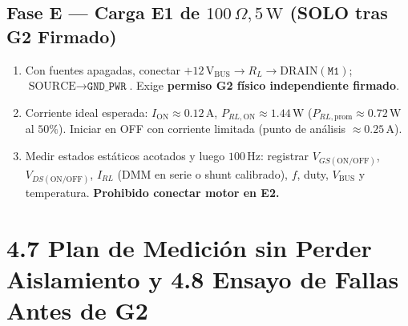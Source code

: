 \documentclass[10pt, a4paper, landscape]{article}
\begin{document}
\begin{minipage}[t]{0.48\linewidth}
\subsection*{Fase E — Carga E1 de $100\,\Omega, 5\,\text{W}$ (SOLO tras G2 Firmado)}
\begin{enumerate}[noitemsep, topsep=2pt]
    \item Con fuentes apagadas, conectar $+12\,\text{V}_{\text{BUS}} \rightarrow R_L \rightarrow \text{DRAIN}(\texttt{M1})$; $\text{SOURCE} \rightarrow \texttt{GND\_PWR}$. Exige \textbf{permiso G2 físico independiente firmado}.
    \item Corriente ideal esperada: $I_{\text{ON}} \approx 0.12\,\text{A}$, $P_{RL,\text{ON}} \approx 1.44\,\text{W}$ ($P_{RL,\text{prom}} \approx 0.72\,\text{W}$ al $50\%$). Iniciar en OFF con corriente limitada (punto de análisis $\approx 0.25\,\text{A}$).
    \item Medir estados estáticos acotados y luego $100\,\text{Hz}$: registrar $V_{GS(\text{ON/OFF})}$, $V_{DS(\text{ON/OFF})}$, $I_{RL}$ (DMM en serie o shunt calibrado), $f$, duty, $V_{\text{BUS}}$ y temperatura. \textbf{Prohibido conectar motor en E2.}
\end{enumerate}
\end{minipage}

\newpage
\section*{4.7 Plan de Medición sin Perder Aislamiento y 4.8 Ensayo de Fallas Antes de G2}
\end{document}
